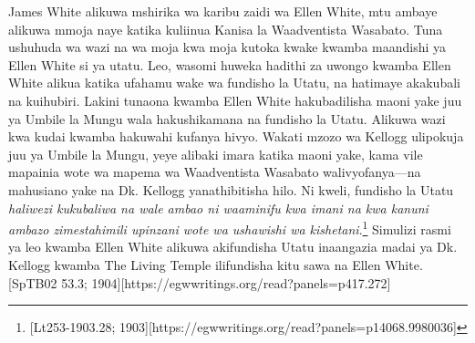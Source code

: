James White alikuwa mshirika wa karibu zaidi wa Ellen White, mtu ambaye alikuwa mmoja naye katika kuliinua Kanisa la Waadventista Wasabato. Tuna ushuhuda wa wazi na wa moja kwa moja kutoka kwake kwamba maandishi ya Ellen White si ya utatu. Leo, wasomi huweka hadithi za uwongo kwamba Ellen White alikua katika ufahamu wake wa fundisho la Utatu, na hatimaye akakubali na kuihubiri. Lakini tunaona kwamba Ellen White hakubadilisha maoni yake juu ya Umbile la Mungu wala hakushikamana na fundisho la Utatu. Alikuwa wazi kwa kudai kwamba hakuwahi kufanya hivyo. Wakati mzozo wa Kellogg ulipokuja juu ya Umbile la Mungu, yeye alibaki imara katika maoni yake, kama vile mapainia wote wa mapema wa Waadventista Wasabato walivyofanya—na mahusiano yake na Dk. Kellogg yanathibitisha hilo. Ni kweli, fundisho la Utatu \textit{haliwezi kukubaliwa na wale ambao ni waaminifu kwa imani na kwa kanuni ambazo zimestahimili upinzani wote wa ushawishi wa kishetani}.\footnote{[Lt253-1903.28; 1903][https://egwwritings.org/read?panels=p14068.9980036]} Simulizi rasmi ya leo kwamba Ellen White alikuwa akifundisha Utatu inaangazia madai ya Dk. Kellogg kwamba The Living Temple ilifundisha kitu sawa na Ellen White. [SpTB02 53.3; 1904][https://egwwritings.org/read?panels=p417.272]




